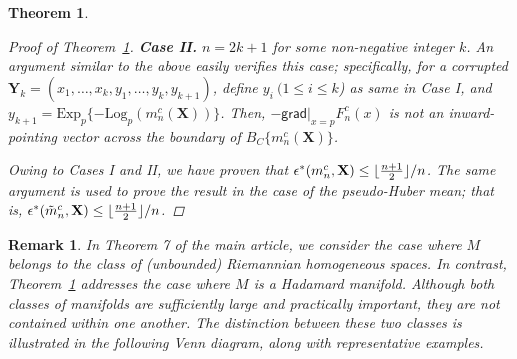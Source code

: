 \documentclass[preprint]{imsart}
\DeclarePairedDelimiter\floor{\lfloor}{\rfloor}
\theoremstyle{plain}
\newtheorem{theorem}{Theorem}
\newtheorem{remark}{Remark}
\theoremstyle{remark}
\begin{document}
\begin{appendix}
\begin{theorem}
\begin{proof}[Proof of Theorem~\ref{thm:hada:supp}]
\textbf{Case II.} $n=2k+1$ for some non-negative integer $k$.
An argument similar to the above easily verifies this case; specifically, for a corrupted $\textbf{Y}_{k}= (x_1, \ldots, x_k, y_1, \ldots, y_k, y_{k+1})$, define $y_i ~ (1 \le i \le k$) as same in Case I, and $y_{k+1} = \mbox{Exp}_{p}\{-\mbox{Log}_p(m^{c}_{n}(\mathbf{X}))\}$. Then, $-\textsf{grad}|_{x=p}F^{c}_{n}(x)$ is not an inward-pointing vector across the boundary of $B_{C}\{m^{c}_{n}(\textbf{X})\}$.


Owing to Cases I and II, we have proven that $\epsilon^{*}(m^{c}_{n},\mathbf{X}) \le \floor{\frac{n+1}{2}}/n$. The same argument is used to prove the result in the case of the pseudo-Huber mean; that is, $\epsilon^{*}(\tilde{m}^{c}_{n},\mathbf{X}) \le \floor{\frac{n+1}{2}}/n$. 
\end{proof}
\label{thm:hada:supp}
\end{theorem}


\begin{remark} In Theorem 7 of the main article, we consider the case where $M$ belongs to the class of (unbounded) Riemannian homogeneous spaces. In contrast, Theorem~\ref{thm:hada:supp} addresses the case where $M$ is a Hadamard manifold. 
Although both classes of manifolds are sufficiently large and practically important, they are not contained within one another.
The distinction between these two classes is illustrated in the following Venn diagram, along with representative examples.
\end{remark}
{ 
\begin{center} 
\end{center}}
\end{appendix}
\end{document}
